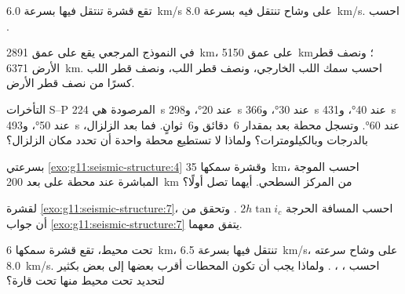 \begin{exercise}[$\star$]\label{exo:g11:seismic-structure:4}
تقع قشرة تنتقل فيها  بسرعة \qty{6.0}{km/s} على وشاح
تنتقل فيه بسرعة \qty{8.0}{km/s}. احسب .
\end{exercise}

\begin{exercise}[$\star$]\label{exo:g11:seismic-structure:5}
في النموذج المرجعي يقع  على عمق \qty{2891}{km}،
 على عمق \qty{5150}{km}؛ ونصف قطر الأرض
\qty{6371}{km}. احسب سمك اللب الخارجي، ونصف قطر
اللب، ونصف قطر اللب كسرًا من نصف قطر الأرض.
\end{exercise}

\begin{exercise}[$\star\star$]\label{exo:g11:seismic-structure:6}
التأخرات S--P المرصودة هي \qty{224}{s} عند \ang{20}، و\qty{298}{s} عند
\ang{30}، و\qty{366}{s} عند \ang{40}، و\qty{431}{s} عند \ang{50}،
و\qty{493}{s} عند \ang{60}. وتسجل محطة  بعد  بمقدار 6~دقائق و6~ثوانٍ.
فما بعد الزلزال، بالدرجات وبالكيلومترات؟
ولماذا لا تستطيع محطة واحدة أن تحدد مكان الزلزال؟
\end{exercise}

\begin{exercise}[$\star\star$]\label{exo:g11:seismic-structure:7}
بسرعتي \cref{exo:g11:seismic-structure:4} وقشرة
سمكها \qty{35}{km}، احسب  الموجة المباشرة  عند محطة على بعد \qty{200}{km} من المركز السطحي. أيهما تصل أولًا؟
\end{exercise}

\begin{exercise}[$\star\star$]\label{exo:g11:seismic-structure:8}
لقشرة \cref{exo:g11:seismic-structure:7}، احسب المسافة
الحرجة $2h\tan i_c$ . وتحقق من أن جواب
\cref{exo:g11:seismic-structure:7} يتفق معهما.
\end{exercise}

\begin{exercise}[$\star\star$]\label{exo:g11:seismic-structure:9}
تحت محيط، تقع قشرة سمكها \qty{6}{km}، تنتقل فيها  بسرعة
\qty{6.5}{km/s}، على وشاح سرعته \qty{8.0}{km/s}. احسب ، ، . ولماذا يجب أن تكون المحطات
أقرب بعضها إلى بعض بكثير لتحديد  تحت محيط منها تحت
قارة؟
\end{exercise}

